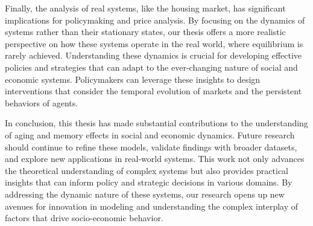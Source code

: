 Finally, the analysis of real systems, like the housing market, has significant implications for policymaking and price analysis. By focusing on the dynamics of systems rather than their stationary states, our thesis offers a more realistic perspective on how these systems operate in the real world, where equilibrium is rarely achieved. Understanding these dynamics is crucial for developing effective policies and strategies that can adapt to the ever-changing nature of social and economic systems. Policymakers can leverage these insights to design interventions that consider the temporal evolution of markets and the persistent behaviors of agents.

In conclusion, this thesis has made substantial contributions to the understanding of aging and memory effects in social and economic dynamics. Future research should continue to refine these models, validate findings with broader datasets, and explore new applications in real-world systems. This work not only advances the theoretical understanding of complex systems but also provides practical insights that can inform policy and strategic decisions in various domains. By addressing the dynamic nature of these systems, our research opens up new avenues for innovation in modeling and understanding the complex interplay of factors that drive socio-economic behavior.
